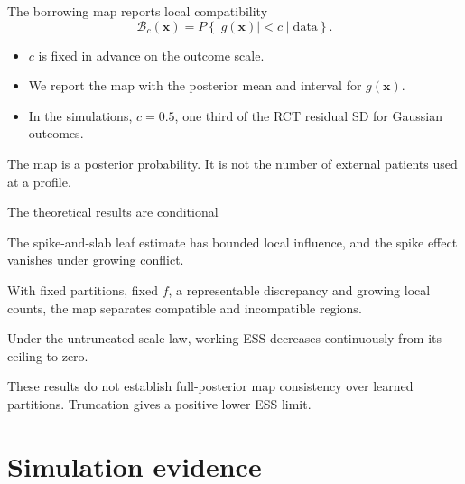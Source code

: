 \documentclass[11pt,aspectratio=169]{beamer}
\newcommand{\bx}{\bm{x}}
\newcommand{\key}[1]{{\color{AccentBlue}\textbf{#1}}}
\newcommand{\sectionframe}[1]{%
  \begin{frame}[plain]
    \vspace*{0.46\paperheight}
    \hspace*{0.65cm}{\LARGE\bfseries #1}
  \end{frame}}
\begin{document}
\begin{frame}{The borrowing map reports local compatibility}
  \large
  \[
    \mathcal B_c(\bx)
    =P\!\left\{|g(\bx)|<c\mid\text{data}\right\}.
  \]

  \vspace{0.7em}
  \begin{itemize}\setlength\itemsep{0.75em}
    \item $c$ is fixed in advance on the outcome scale.
    \item We report the map with the posterior mean and interval for $g(\bx)$.
    \item In the simulations, $c=0.5$, one third of the RCT residual SD for Gaussian outcomes.
  \end{itemize}

  \vfill
  {\small The map is a posterior probability. It is not the number of external patients used at a profile.}
\end{frame}

\begin{frame}{The theoretical results are conditional}
  \large
  \begin{description}\setlength\itemsep{0.8em}
    \item[\key{Influence}] The spike-and-slab leaf estimate has bounded local influence, and the spike effect vanishes under growing conflict.
    \item[\key{Detection}] With fixed partitions, fixed $f$, a representable discrepancy and growing local counts, the map separates compatible and incompatible regions.
    \item[\key{Calibration}] Under the untruncated scale law, working ESS decreases continuously from its ceiling to zero.
  \end{description}

  \vfill
  {\small These results do not establish full-posterior map consistency over learned partitions. Truncation gives a positive lower ESS limit.}
\end{frame}

\section{Simulation evidence}
\sectionframe{Simulation evidence}
\end{document}
